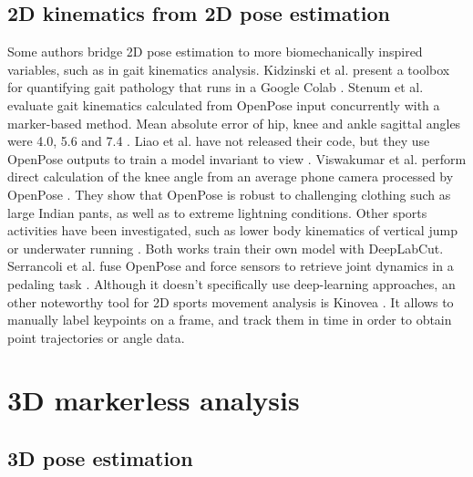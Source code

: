 \subsection{2D kinematics from 2D pose estimation}

Some authors bridge 2D pose estimation to more biomechanically inspired variables, such as in gait kinematics analysis. Kidzinski et al. present a toolbox for quantifying gait pathology that runs in a Google Colab \cite{Kidziński2020}. Stenum et al. evaluate gait kinematics calculated from OpenPose input concurrently with a marker-based method. Mean absolute error of hip, knee and ankle sagittal angles were 4.0\degree{}, 5.6\degree{} and 7.4\degree{} \cite{Stenum2021}. Liao et al. have not released their code, but they use OpenPose outputs to train a model invariant to view \cite{Liao2020}. Viswakumar et al. perform direct calculation of the knee angle from an average phone camera processed by OpenPose \cite{Viswakumar2019}. They show that OpenPose is robust to challenging clothing such as large Indian pants, as well as to extreme lightning conditions. Other sports activities have been investigated, such as lower body kinematics of vertical jump \cite{Drazan2021} or underwater running \cite{Cronin2019}. Both works train their own model with DeepLabCut. Serrancoli et al. fuse OpenPose and force sensors to retrieve joint dynamics in a pedaling task \cite{Serrancolí2020}. Although it doesn't specifically use deep-learning approaches, an other noteworthy tool for 2D sports movement analysis is Kinovea \cite{Fernandez2020}. It allows to manually label keypoints on a frame, and track them in time in order to obtain point trajectories or angle data. 


\FloatBarrier
\section{3D markerless analysis} 
\subsection{3D pose estimation}

